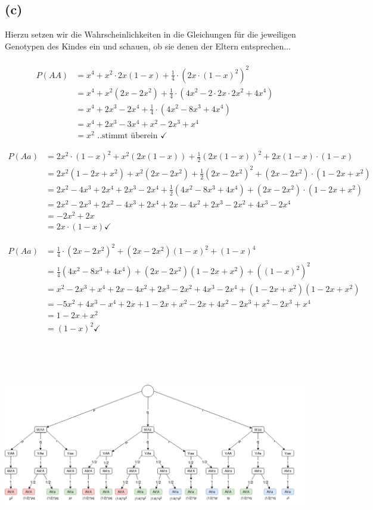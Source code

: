 \documentclass[a4paper]{scrartcl}
\begin{document}
\subsection*{(c)}
Hierzu setzen wir die Wahrscheinlichkeiten in die Gleichungen für die jeweiligen Genotypen des Kindes ein und schauen, ob sie denen der Eltern entsprechen...\\
\\
\begin{align*}
P(AA) &= x^4 + x^2 \cdot 2x(1-x) + \frac{1}{4} \cdot (2x \cdot(1-x)^2)^2\\
&= x^4 + x^2(2x-2x^2) + \frac{1}{4} \cdot (4x^2 - 2 \cdot 2x \cdot 2x^2 + 4x^4)\\
&=x^4 + 2x^3 - 2x^4 + \frac{1}{4} \cdot (4x^2 - 8x^3 + 4x^4)\\
&=x^4 + 2x^3 - 3x^4 + x^2 - 2x^3 + x^4\\
&=x^2 \text{ ..stimmt überein   }\checkmark 
\end{align*}

\begin{align*}
P(Aa) &= 2x^2 \cdot (1-x)^2 + x^2(2x(1-x)) + \frac{1}{2}(2x(1-x))^2 + 2x(1-x) \cdot (1-x)\\
&= 2x^2(1-2x+x^2) + x^2(2x-2x^2) + \frac{1}{2}(2x-2x^2)^2 + (2x-2x^2)\cdot(1-2x+x^2)\\
&= 2x^2 - 4x^3 + 2x^4 + 2x^3 -2x^4 + \frac{1}{2} (4x^2 -8x^3 + 4x^4) + (2x-2x^2) \cdot (1-2x + x^2)\\
&= 2x^2 -2x^3 + 2x^2 - 4x^3 + 2x^4 + 2x - 4x^2 + 2x^3 - 2x^2 + 4x^3 -2x^4\\
&=-2x^2 + 2x\\
&=2x\cdot(1-x) \checkmark
\end{align*}


\begin{align*}
P(Aa) &= \frac{1}{4} \cdot (2x - 2x^2)^2 + (2x-2x^2) (1-x)^2 + (1-x)^4\\
&=\frac{1}{4} (4x^2 - 8x^3 + 4x^4) + (2x-2x^2)(1-2x + x^2) + ((1-x)^2)^2\\
&=x^2 - 2x^3 + x^4 + 2x - 4x^2 + 2x^3 - 2x^2 + 4x^3 -2x^4 + (1-2x+x^2)(1-2x+x^2)\\
&=-5x^2 + 4x^3 -x^4 + 2x +1-2x + x^2 -2x + 4x^2 -2x^3 + x^2 -2x^3 + x^4\\
&=1-2x + x^2\\
&=(1-x)^2 \checkmark
\end{align*}






\newpage
\begin{landscape}
	\includegraphics[height=9cm,width=22cm]{stocha_blatt3_3a.png}
\end{landscape}
\end{document}

